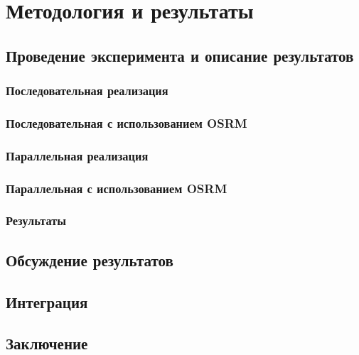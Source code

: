 \chapter{Методология и результаты}
\section{Проведение эксперимента и описание результатов}
\subsection{Последовательная реализация}
\subsection{Последовательная с использованием OSRM}
\subsection{Параллельная реализация}
\subsection{Параллельная с использованием OSRM}
\subsection{Результаты}
\section{Обсуждение результатов}
\section{Интеграция}
\section{Заключение}
